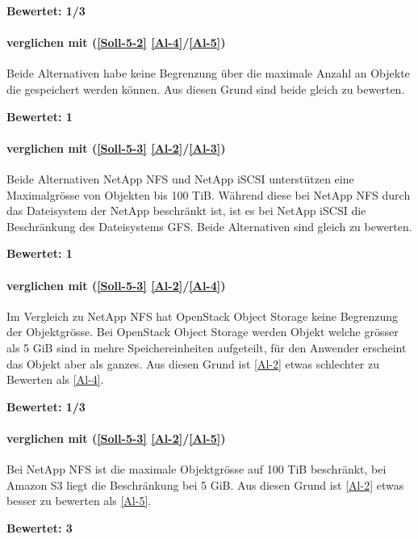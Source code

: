\textbf{Bewertet: 1/3}


\paragraph*{  verglichen mit  (\ref{Soll-5-2} \ref{Al-4}/\ref{Al-5})}
Beide Alternativen habe keine Begrenzung über die maximale Anzahl an Objekte die gespeichert werden können. Aus diesen Grund sind beide gleich zu bewerten.

\textbf{Bewertet: 1}


\paragraph*{  verglichen mit  (\ref{Soll-5-3} \ref{Al-2}/\ref{Al-3})}
Beide Alternativen NetApp NFS und NetApp iSCSI unterstützen eine Maximalgrösse von Objekten bis 100 TiB. Während diese bei NetApp NFS durch das Dateisystem der NetApp beschränkt ist, ist es bei NetApp iSCSI die Beschränkung des Dateisystems GFS. Beide Alternativen sind gleich zu bewerten.

\textbf{Bewertet: 1}

\paragraph*{  verglichen mit  (\ref{Soll-5-3} \ref{Al-2}/\ref{Al-4})}
Im Vergleich zu NetApp NFS hat OpenStack Object Storage keine Begrenzung der Objektgrösse. Bei OpenStack Object Storage werden Objekt welche grösser als 5 GiB sind in mehre Speichereinheiten aufgeteilt, für den Anwender erscheint das Objekt aber als ganzes. Aus diesen Grund ist  \ref{Al-2} etwas schlechter zu Bewerten als  \ref{Al-4}.

\textbf{Bewertet: 1/3}

\paragraph*{  verglichen mit  (\ref{Soll-5-3} \ref{Al-2}/\ref{Al-5})}
Bei NetApp NFS ist die maximale Objektgrösse auf 100 TiB beschränkt, bei Amazon S3 liegt die Beschränkung bei 5 GiB. Aus diesen Grund ist  \ref{Al-2} etwas besser zu bewerten als  \ref{Al-5}.

\textbf{Bewertet: 3}

